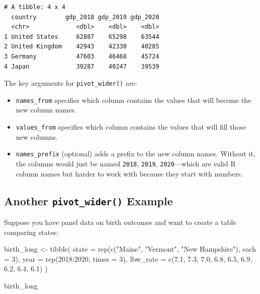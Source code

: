 \documentclass[
  letterpaper,
  DIV=11,
  numbers=noendperiod]{scrreprt}
\newenvironment{Shaded}{\begin{snugshade}}{\end{snugshade}}
\newcommand{\AttributeTok}[1]{\textcolor[rgb]{0.40,0.45,0.13}{#1}}
\newcommand{\DecValTok}[1]{\textcolor[rgb]{0.68,0.00,0.00}{#1}}
\newcommand{\FloatTok}[1]{\textcolor[rgb]{0.68,0.00,0.00}{#1}}
\newcommand{\FunctionTok}[1]{\textcolor[rgb]{0.28,0.35,0.67}{#1}}
\newcommand{\NormalTok}[1]{\textcolor[rgb]{0.00,0.23,0.31}{#1}}
\newcommand{\OtherTok}[1]{\textcolor[rgb]{0.00,0.23,0.31}{#1}}
\newcommand{\SpecialCharTok}[1]{\textcolor[rgb]{0.37,0.37,0.37}{#1}}
\newcommand{\StringTok}[1]{\textcolor[rgb]{0.13,0.47,0.30}{#1}}
\providecommand{\tightlist}{%
  \setlength{\itemsep}{0pt}\setlength{\parskip}{0pt}}
\begin{document}
\begin{verbatim}
# A tibble: 4 x 4
  country        gdp_2018 gdp_2019 gdp_2020
  <chr>             <dbl>    <dbl>    <dbl>
1 United States     62887    65298    63544
2 United Kingdom    42943    42330    40285
3 Germany           47603    46468    45724
4 Japan             39287    40247    39539
\end{verbatim}

The key arguments for \texttt{pivot\_wider()} are:

\begin{itemize}
\tightlist
\item
  \texttt{names\_from} specifies which column contains the values that
  will become the new column names.
\item
  \texttt{values\_from} specifies which column contains the values that
  will fill those new columns.
\item
  \texttt{names\_prefix} (optional) adds a prefix to the new column
  names. Without it, the columns would just be named \texttt{2018},
  \texttt{2019}, \texttt{2020}---which are valid R column names but
  harder to work with because they start with numbers.
\end{itemize}

\subsection{\texorpdfstring{Another \texttt{pivot\_wider()}
Example}{Another pivot\_wider() Example}}\label{another-pivot_wider-example}

Suppose you have panel data on birth outcomes and want to create a table
comparing states:

\begin{Shaded}
\begin{Highlighting}[]
\NormalTok{birth\_long }\OtherTok{\textless{}{-}} \FunctionTok{tibble}\NormalTok{(}
  \AttributeTok{state =} \FunctionTok{rep}\NormalTok{(}\FunctionTok{c}\NormalTok{(}\StringTok{"Maine"}\NormalTok{, }\StringTok{"Vermont"}\NormalTok{, }\StringTok{"New Hampshire"}\NormalTok{), }\AttributeTok{each =} \DecValTok{3}\NormalTok{),}
  \AttributeTok{year =} \FunctionTok{rep}\NormalTok{(}\DecValTok{2018}\SpecialCharTok{:}\DecValTok{2020}\NormalTok{, }\AttributeTok{times =} \DecValTok{3}\NormalTok{),}
  \AttributeTok{lbw\_rate =} \FunctionTok{c}\NormalTok{(}\FloatTok{7.1}\NormalTok{, }\FloatTok{7.3}\NormalTok{, }\FloatTok{7.0}\NormalTok{,}
               \FloatTok{6.8}\NormalTok{, }\FloatTok{6.5}\NormalTok{, }\FloatTok{6.9}\NormalTok{,}
               \FloatTok{6.2}\NormalTok{, }\FloatTok{6.4}\NormalTok{, }\FloatTok{6.1}\NormalTok{)}
\NormalTok{)}

\NormalTok{birth\_long}
\end{Highlighting}
\end{Shaded}
\end{document}
